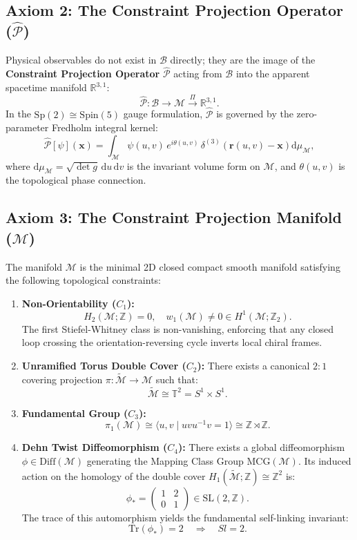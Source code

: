 \documentclass[11pt, a4paper, twocolumn]{article}
\theoremstyle{plain}
\theoremstyle{definition}
\begin{document}
\subsection{Axiom 2: The Constraint Projection Operator ($\hat{\mathcal{P}}$)}
Physical observables do not exist in $\mathcal{B}$ directly; they are the image of the \textbf{Constraint Projection Operator} $\hat{\mathcal{P}}$ acting from $\mathcal{B}$ into the apparent spacetime manifold $\mathbb{R}^{3,1}$:
\[
\hat{\mathcal{P}}: \mathcal{B} \longrightarrow \mathcal{M} \overset{\Pi}{\longrightarrow} \mathbb{R}^{3,1}.
\]
In the $\mathrm{Sp}(2) \cong \mathrm{Spin}(5)$ gauge formulation, $\hat{\mathcal{P}}$ is governed by the zero-parameter Fredholm integral kernel:
\[
\hat{\mathcal{P}}[\psi](\mathbf{x}) = \int_{\mathcal{M}} \psi(u,v) \, e^{i \theta(u,v)} \, \delta^{(3)}\!\left(\mathbf{r}(u,v) - \mathbf{x}\right) \mathrm{d}\mu_{\mathcal{M}},
\]
where $\mathrm{d}\mu_{\mathcal{M}} = \sqrt{\det g} \, \mathrm{d}u \, \mathrm{d}v$ is the invariant volume form on $\mathcal{M}$, and $\theta(u,v)$ is the topological phase connection.

\subsection{Axiom 3: The Constraint Projection Manifold ($\mathcal{M}$)}
The manifold $\mathcal{M}$ is the minimal 2D closed compact smooth manifold satisfying the following topological constraints:

\begin{enumerate}
\item \textbf{Non-Orientability ($C_1$):}
\[
H_2(\mathcal{M}; \mathbb{Z}) = 0, \quad w_1(\mathcal{M}) \neq 0 \in H^1(\mathcal{M}; \mathbb{Z}_2).
\]
The first Stiefel-Whitney class is non-vanishing, enforcing that any closed loop crossing the orientation-reversing cycle inverts local chiral frames.

\item \textbf{Unramified Torus Double Cover ($C_2$):}
There exists a canonical $2:1$ covering projection $\pi: \widetilde{\mathcal{M}} \to \mathcal{M}$ such that:
\[
\widetilde{\mathcal{M}} \cong \mathbb{T}^2 = S^1 \times S^1.
\]

\item \textbf{Fundamental Group ($C_3$):}
\[
\pi_1(\mathcal{M}) \cong \langle u, v \mid u v u^{-1} v = 1 \rangle \cong \mathbb{Z} \rtimes \mathbb{Z}.
\]

\item \textbf{Dehn Twist Diffeomorphism ($C_4$):}
There exists a global diffeomorphism $\phi \in \mathrm{Diff}(\mathcal{M})$ generating the Mapping Class Group $\mathrm{MCG}(\mathcal{M})$. Its induced action on the homology of the double cover $H_1(\widetilde{\mathcal{M}}; \mathbb{Z}) \cong \mathbb{Z}^2$ is:
\[
\phi_* = \begin{pmatrix} 1 & 2 \\ 0 & 1 \end{pmatrix} \in \mathrm{SL}(2, \mathbb{Z}).
\]
The trace of this automorphism yields the fundamental self-linking invariant:
\[
\mathrm{Tr}(\phi_*) = 2 \quad \Longrightarrow \quad Sl = 2.
\]
\end{enumerate}
\end{document}

